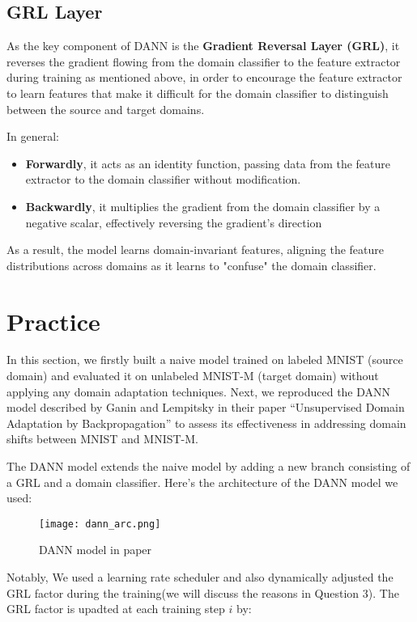 \documentclass{rapportECL}
\begin{document}
\subsection{GRL Layer}
As the key component of DANN is the \textbf{Gradient Reversal Layer (GRL)}, it reverses the gradient flowing from the domain classifier to the feature extractor during training as mentioned above, in order to encourage the feature extractor to learn features that make it difficult for the domain classifier to distinguish between the source and target domains. 

In general:
\begin{itemize}[labelwidth=4cm, labelsep=0.2cm, leftmargin=0.5cm]
    \item \textbf{Forwardly}, it acts as an identity function, passing data from the feature extractor to the domain classifier without modification. 
    \item \textbf{Backwardly}, it multiplies the gradient from the domain classifier by a negative scalar, effectively reversing the gradient’s direction
\end{itemize}

As a result, the model learns domain-invariant features, aligning the feature distributions across domains as it learns to "confuse" the domain classifier.

\section{Practice}
In this section, we firstly built a naive model trained on labeled MNIST (source domain) and evaluated it on unlabeled MNIST-M (target domain) without applying any domain adaptation techniques. Next, we reproduced the DANN model described by Ganin and Lempitsky in their paper “Unsupervised Domain Adaptation by Backpropagation” to assess its effectiveness in addressing domain shifts between MNIST and MNIST-M.

The DANN model extends the naive model by adding a new branch consisting of a GRL and a domain classifier. Here's the architecture of the DANN model we used:
\begin{figure}[H]
    \centering
    \texttt{[image: dann\_arc.png]}
    \caption{DANN model in paper}
\end{figure}

Notably, We used a learning rate scheduler and also dynamically adjusted the GRL factor during the training(we will discuss the reasons in Question 3). The GRL factor is upadted at each training step $i$ by:
\end{document}
